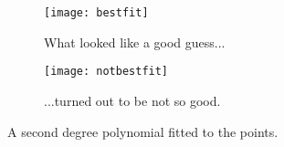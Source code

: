 \begin{figure}[ht]
    \centering
    \begin{subfigure}[b]{0.5\textwidth}
        \texttt{[image: bestfit]}
        \caption{What looked like a good guess...}
        \label{fig:bestfit}
    \end{subfigure}%
    \begin{subfigure}[b]{0.5\textwidth}
        \texttt{[image: notbestfit]}
        \caption{...turned out to be not so good.}
        \label{fig:notbestfit}
    \end{subfigure}
    \caption{A second degree polynomial fitted to the points.}
    \label{fig:fitting}
\end{figure}

